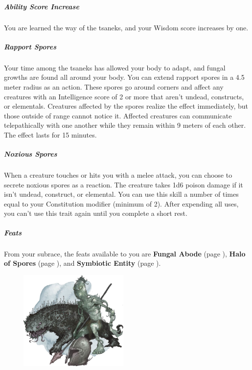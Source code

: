     \subparagraph{Ability Score Increase} You are learned the way of the tsaneks, and your Wisdom score increases by one.

    \subparagraph{Rapport Spores} Your time among the tsaneks has allowed your body to adapt, and fungal growths are found all around your body.
    You can extend rapport spores in a 4.5 meter radius as an action.
    These spores go around corners and affect any creatures with an Intelligence score of 2 or more that aren't undead, constructs, or elementals.
    Creatures affected by the spores realize the effect immediately, but those outside of range cannot notice it.
    Affected creatures can communicate telepathically with one another while they remain within 9 meters of each other.
    The effect lasts for 15 minutes.

    \subparagraph{Noxious Spores} When a creature touches or hits you with a melee attack, you can choose to secrete noxious spores as a reaction.
    The creature takes 1d6 poison damage if it isn't undead, construct, or elemental.
    You can use this skill a number of times equal to your Constitution modifier (minimum of 2).
    After expending all uses, you can't use this trait again until you complete a short rest.

    \subparagraph{Feats} From your subrace, the feats available to you are
    \textbf{Fungal Abode} (page \pageref{feat::fungalabode}),
    \textbf{Halo of Spores} (page \pageref{feat::haloofspores}), and
    \textbf{Symbiotic Entity} (page \pageref{feat::symbioticentity}).

\begin{figure}[!b]
    \centering
    \includegraphics[width=0.48\textwidth]{04kins/img/15naenk_nuen.png}
\end{figure}

\newpage
